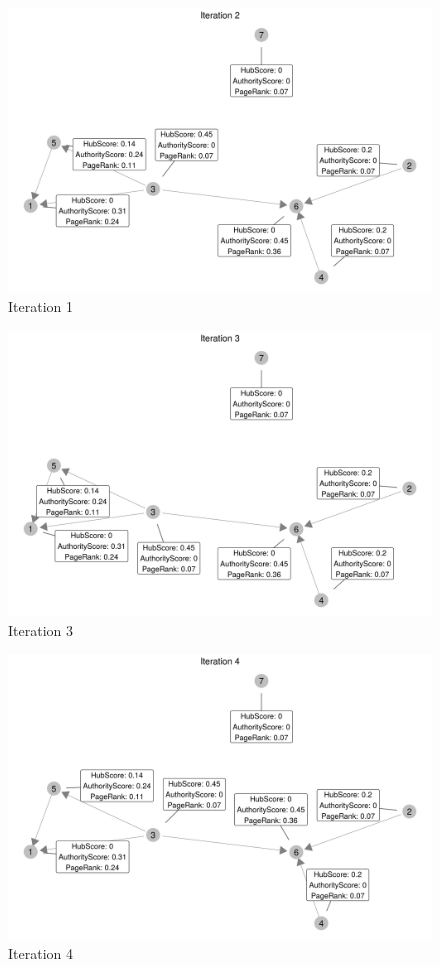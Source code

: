 \documentclass[11pt]{article}
\begin{document}
\begin{figure}[H]
\centering
\includegraphics[scale=.8]{q1_iteration2.png}
\caption{Iteration 1}
\label{fig:q1_i2}
\end{figure}
\begin{figure}[H]
\centering
\includegraphics[scale=.8]{q1_iteration3.png}
\caption{Iteration 3}
\label{fig:q1_i3}
\end{figure}
\begin{figure}[H]
\centering
\includegraphics[scale=.8]{q1_iteration4.png}
\caption{Iteration 4}
\label{fig:q1_i4}
\end{figure}
\end{document}
